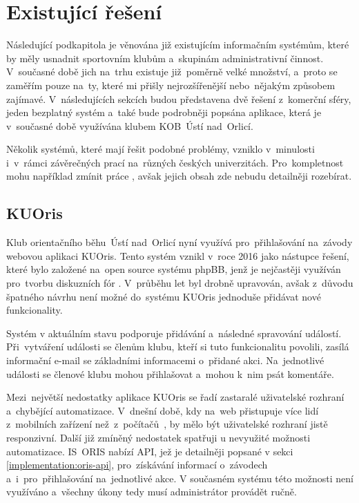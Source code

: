 \section{Existující řešení}
Následující podkapitola je věnována již existujícím informačním systémům, které by měly usnadnit sportovním klubům a~skupinám administrativní činnost. V~současné době jich na~trhu existuje již~poměrně velké množství, a~proto se zaměřím pouze na~ty, které mi přišly nejrozšířenější nebo~nějakým způsobem zajímavé. V~následujících sekcích budou představena dvě řešení z~komerční sféry, jeden bezplatný systém a~také bude podrobněji popsána aplikace, která je v~současné době využívána klubem KOB~Ústí nad~Orlicí.

Několik systémů, které mají řešit podobné problémy, vzniklo v~minulosti i~v~rámci závěrečných prací na~různých českých univerzitách. Pro~kompletnost mohu například zmínit práce \cite{fimuni2021, fitcvut2016, fisvse2013}, avšak jejich obsah zde nebudu detailněji rozebírat.

\subsection{KUOris}
\label{section:kuoris}
Klub orientačního běhu~Ústí nad~Orlicí nyní využívá pro~přihlašování na~závody webovou aplikaci KUOris. Tento systém vznikl v~roce 2016 jako nástupce řešení, které bylo založené na~open source systému phpBB, jenž je nejčastěji využíván pro~tvorbu diskuzních fór \cite{phpbb}. V~průběhu let byl drobně upravován, avšak z~důvodu špatného návrhu není možné do~systému KUOris jednoduše přidávat nové funkcionality.

Systém v aktuálním stavu podporuje přidávání a~následné spravování událostí. Při~vytváření události se členům klubu, kteří si tuto funkcionalitu povolili, zasílá informační e-mail se základními informacemi o~přidané akci. Na~jednotlivé události se členové klubu mohou přihlašovat a~mohou k~nim psát komentáře.

Mezi~největší nedostatky aplikace KUOris se řadí zastaralé uživatelské rozhraní a~chybějící automatizace. V~dnešní době, kdy na~web přistupuje více lidí z~mobilních zařízení než~z~počítačů~\cite{deviceusage}, by mělo být uživatelské rozhraní jistě responzivní. Další již zmíněný nedostatek spatřuji u nevyužité možnosti automatizace. IS~ORIS nabízí API, jež je detailněji popsané v sekci \ref{implementation:oris-api}, pro~získávání informací o~závodech a~i~pro~přihlašování na~jednotlivé akce. V současném systému této možnosti není využíváno a~všechny úkony tedy musí administrátor provádět ručně.

